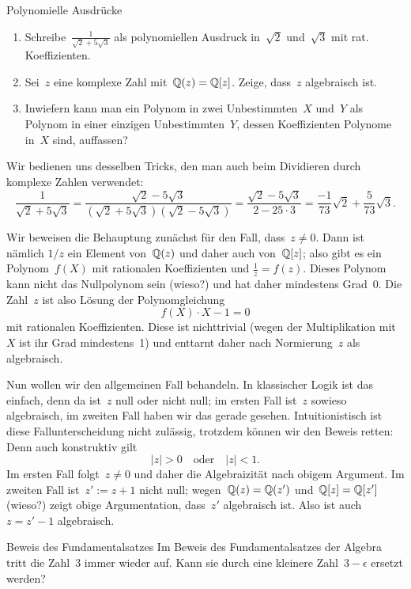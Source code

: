 \documentclass{algblatt}
\begin{document}
\begin{aufgabe}{Polynomielle Ausdrücke}
\begin{enumerate}
\item Schreibe~$\frac{1}{\sqrt{2} + 5\sqrt{3}}$ als polynomiellen Ausdruck
in~$\sqrt{2}$ und~$\sqrt{3}$ mit rat. Koeffizienten.
\item Sei~$z$ eine komplexe Zahl mit~$\mathbb{Q}(z) = \mathbb{Q}[z]$. Zeige, dass~$z$
algebraisch ist.
\item Inwiefern kann man ein Polynom in zwei Unbestimmten~$X$ und~$Y$ als
Polynom in einer einzigen Unbestimmten~$Y$, dessen Koeffizienten
Polynome in~$X$ sind, auffassen?
\end{enumerate}
\begin{loesungE}
\item Wir bedienen uns desselben Tricks, den man auch beim Dividieren durch
komplexe Zahlen verwendet:
\[ \frac{1}{\sqrt{2} + 5\sqrt{3}} =
  \frac{\sqrt{2} - 5\sqrt{3}}{(\sqrt{2} + 5\sqrt{3}) (\sqrt{2} - 5\sqrt{3})} =
  \frac{\sqrt{2} - 5\sqrt{3}}{2 - 25 \cdot 3} =
  \frac{-1}{73} \sqrt{2} + \frac{5}{73} \sqrt{3}. \]

\item Wir beweisen die Behauptung zunächst für den Fall, dass~$z \neq 0$. Dann
ist nämlich $1/z$ ein Element von~$\mathbb{Q}(z)$ und daher auch von~$\mathbb{Q}[z]$; also
gibt es ein Polynom~$f(X)$ mit rationalen Koeffizienten und
$\frac{1}{z} = f(z)$. Dieses Polynom kann nicht das Nullpolynom sein (wieso?)
und hat daher mindestens Grad~0. Die Zahl~$z$ ist also Lösung der
Polynomgleichung
\[ f(X) \cdot X - 1 = 0 \]
mit rationalen Koeffizienten. Diese ist nichttrivial (wegen der Multiplikation
mit~$X$ ist ihr Grad mindestens~1) und enttarnt daher nach Normierung~$z$ als
algebraisch.

Nun wollen wir den allgemeinen Fall behandeln. In klassischer Logik ist das
einfach, denn da ist~$z$ null oder nicht null; im ersten Fall ist~$z$ sowieso
algebraisch, im zweiten Fall haben wir das gerade gesehen. Intuitionistisch ist
diese Fallunterscheidung nicht zulässig, trotzdem können wir den Beweis retten:
Denn auch konstruktiv gilt
\[ |z| > 0 \quad\text{oder}\quad |z| < 1. \]
Im ersten Fall folgt~$z \neq 0$ und daher die Algebraizität nach obigem
Argument. Im zweiten Fall ist~$z' := z + 1$ nicht null; wegen~$\mathbb{Q}(z) =
\mathbb{Q}(z')$ und~$\mathbb{Q}[z] = \mathbb{Q}[z']$ (wieso?) zeigt obige Argumentation, dass~$z'$
algebraisch ist. Also ist auch~$z = z' - 1$ algebraisch.
\end{loesungE}
\end{aufgabe}

\begin{aufgabe}{Beweis des Fundamentalsatzes}
Im Beweis des Fundamentalsatzes der Algebra tritt die Zahl~3 immer wieder auf.
Kann sie durch eine kleinere Zahl~$3-\epsilon$ ersetzt werden?
\end{aufgabe}
\end{document}
